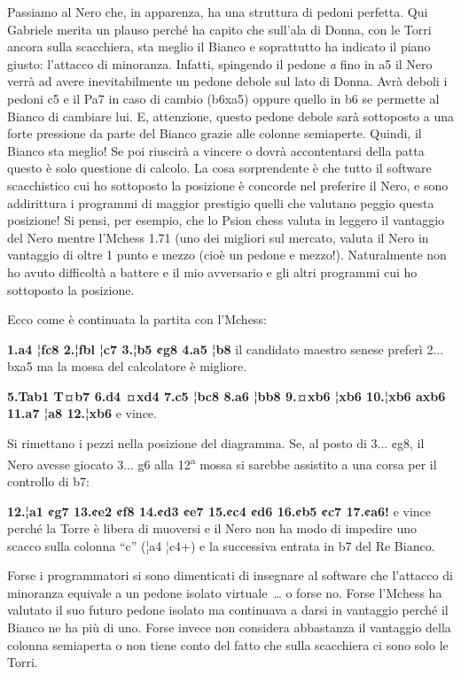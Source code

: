 \documentclass[
]{article}
\begin{document}
Passiamo al Nero che, in apparenza, ha una struttura di pedoni perfetta.
Qui Gabriele merita un plauso perché ha capito che sull'ala di Donna,
con le Torri ancora sulla scacchiera, sta meglio il Bianco e soprattutto
ha indicato il piano giusto: l'attacco di minoranza. Infatti, spingendo
il pedone \emph{a} fino in a5 il Nero verrà ad avere inevitabilmente un
pedone debole sul lato di Donna. Avrà deboli i pedoni c5 e il Pa7 in
caso di cambio (b6xa5) oppure quello in b6 se permette al Bianco di
cambiare lui. E, attenzione, questo pedone debole sarà sottoposto a una
forte pressione da parte del Bianco grazie alle colonne semiaperte.
Quindi, il Bianco sta meglio! Se poi riuscirà a vincere o dovrà
accontentarsi della patta questo è solo questione di calcolo. La cosa
sorprendente è che tutto il software scacchistico cui ho sottoposto la
posizione è concorde nel preferire il Nero, e sono addirittura i
programmi di maggior prestigio quelli che valutano peggio questa
posizione! Si pensi, per esempio, che lo Psion chess valuta in leggero
il vantaggio del Nero mentre l'Mchess 1.71 (uno dei migliori sul
mercato, valuta il Nero in vantaggio di oltre 1 punto e mezzo (cioè un
pedone e mezzo!). Naturalmente non ho avuto difficoltà a battere e il
mio avversario e gli altri programmi cui ho sottoposto la posizione.

Ecco come è continuata la partita con l'Mchess:

\textbf{1.a4 ¦fc8 2.¦fbl ¦c7 3.¦b5 ¢g8 4.a5 ¦b8} il candidato maestro
senese preferì 2... bxa5 ma la mossa del calcolatore è migliore.

\textbf{5.Tab1 T¤b7 6.d4 ¤xd4 7.c5 ¦bc8 8.a6 ¦bb8 9.¤xb6 ¦xb6 10.¦xb6
axb6 11.a7 ¦a8 12.¦xb6} e vince.

Si rimettano i pezzi nella posizione del diagramma. Se, al posto di 3...
¢g8, il Nero avesse giocato 3... g6 alla 12\textsuperscript{a} mossa si
sarebbe assistito a una corsa per il controllo di b7:

\textbf{12.¦a1 ¢g7 13.¢e2 ¢f8 14.¢d3 ¢e7 15.¢c4 ¢d6 16.¢b5 ¢c7 17.¢a6!}
e vince perché la Torre è libera di muoversi e il Nero non ha modo di
impedire uno scacco sulla colonna ``c'' (¦a4 ¦c4+) e la successiva
entrata in b7 del Re Bianco.

Forse i programmatori si sono dimenticati di insegnare al software che
l'attacco di minoranza equivale a un pedone isolato virtuale~\ldots{} o
forse no. Forse l'Mchess ha valutato il suo futuro pedone isolato ma
continuava a darsi in vantaggio perché il Bianco ne ha più di uno. Forse
invece non considera abbastanza il vantaggio della colonna semiaperta o
non tiene conto del fatto che sulla scacchiera ci sono solo le Torri.
\end{document}
